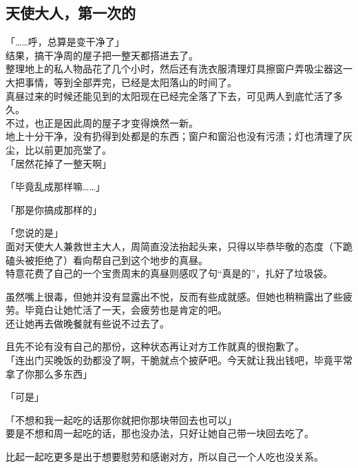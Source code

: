 \subsection{天使大人，第一次的}

「……呼，总算是变干净了」\\

结果，搞干净周的屋子把一整天都搭进去了。\\

整理地上的私人物品花了几个小时，然后还有洗衣服清理灯具擦窗户弄吸尘器这一大把事情，等到全部弄完，已经是太阳落山的时间了。\\

真昼过来的时候还能见到的太阳现在已经完全落了下去，可见两人到底忙活了多久。\\

不过，也正是因此周的屋子才变得焕然一新。\\

地上十分干净，没有扔得到处都是的东西；窗户和窗沿也没有污渍；灯也清理了灰尘，比以前更加亮堂了。\\

「居然花掉了一整天啊」

「毕竟乱成那样嘛……」

「那是你搞成那样的」

「您说的是」\\

面对天使大人兼救世主大人，周简直没法抬起头来，只得以毕恭毕敬的态度（下跪磕头被拒绝了）看向帮自己到这个地步的真昼。\\

特意花费了自己的一个宝贵周末的真昼则感叹了句“真是的”，扎好了垃圾袋。

虽然嘴上很毒，但她并没有显露出不悦，反而有些成就感。但她也稍稍露出了些疲劳。毕竟白让她忙活了一天，会疲劳也是肯定的吧。\\

还让她再去做晚餐就有些说不过去了。

且先不论有没有自己的那份，这种状态再让对方工作就真的很抱歉了。\\

「连出门买晚饭的劲都没了啊，干脆就点个披萨吧。今天就让我出钱吧，毕竟平常拿了你那么多东西」

「可是」

「不想和我一起吃的话那你就把你那块带回去也可以」\\

要是不想和周一起吃的话，那也没办法，只好让她自己带一块回去吃了。

比起一起吃更多是出于想要慰劳和感谢对方，所以自己一个人吃也没关系。\\

